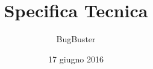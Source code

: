



\title{\textbf{Specifica Tecnica}}
\author{BugBuster}

\date{17 giugno 2016}




\makeFrontPage

\tableofcontents
\listoffigures
\listoftables





